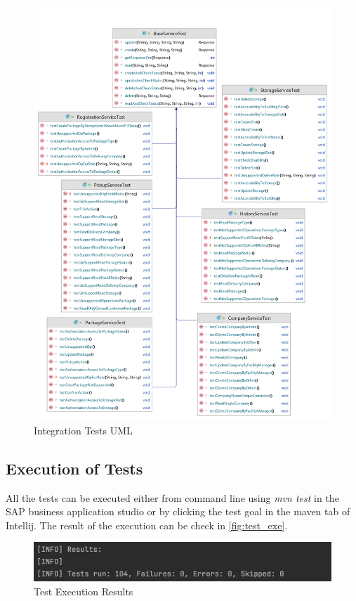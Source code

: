\begin{figure}[H]
    \centering
    \includegraphics[width=1\linewidth]{images/test/api_test_white.png}
    \caption{Integration Tests UML}
    \label{fig:it_uml}
\end{figure}

\subsection{Execution of Tests}
\label{subsec:test-exe}
All the tests can be executed either from command line using \textit{mvn test} in the SAP business application studio or by clicking the test goal in the maven tab of Intellij. The result of the execution can be check in \autoref{fig:test_exe}.

\begin{figure}[H]
    \centering
    \includegraphics[width=0.9\linewidth]{images/test/test_results.png}
    \caption{Test Execution Results}
    \label{fig:test_exe}
\end{figure}

